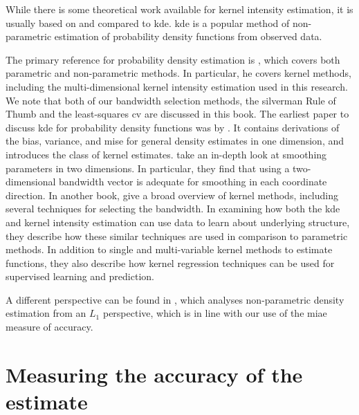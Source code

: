 While there is some theoretical work available for \gls{kernel intensity estimation},
it is usually based on and compared to \acrfull{kde}.
\Gls{kde} is a popular method of non-parametric estimation of probability density functions from observed data.

The primary reference for probability density estimation is \citet{silverman1986density},
which covers both parametric and non-parametric methods.
In particular,
he covers kernel methods,
including the multi-dimensional \gls{kernel intensity estimation} used in this research.
We note that both of our bandwidth selection methods,
the \Gls{silverman} Rule of Thumb and the least-squares \acrlong{cv} are discussed in this book.
The earliest paper to discuss \gls{kde} for probability density functions was by \citet{rosenblatt1956remarks}.
It contains derivations of the bias, variance,
and \acrfull{mise} for general density estimates in one dimension,
and introduces the class of kernel estimates.
 take an in-depth look at smoothing parameters in two dimensions.
In particular,
they find that using a two-dimensional bandwidth vector is adequate for smoothing in each coordinate direction.
In another book, \citet{wand1994kernel}
give a broad overview of kernel methods,
including several techniques for selecting the bandwidth.
In examining how both the \gls{kde} and \gls{kernel intensity estimation} can use data to learn about underlying structure,
they describe how these similar techniques are used in comparison to parametric methods.
In addition to single and multi-variable kernel methods to estimate functions,
they also describe how kernel regression techniques can be used for supervised learning and prediction.

A different perspective can be found in \citet{devroye1985nonparametric},
which analyses non-parametric density estimation from an $L_1$ perspective,
which is in line with our use of the \gls{miae} measure of accuracy.

\section{Measuring the accuracy of the estimate}
\label{sec:theory:accuracy}

